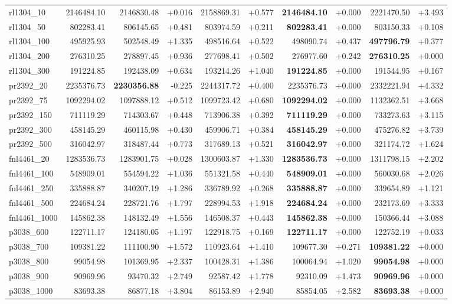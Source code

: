 \begin{table}[!htb]
\begin{tabular}{lrrrrrrrrr}
rl1304\_10 & 2146484.10 & 2146830.48 & +0.016 & 2158869.31 & +0.577 & \textbf{2146484.10} & +0.000 & 2221470.50 & +3.493 \\
rl1304\_50 & 802283.41 & 806145.65 & +0.481 & 803974.59 & +0.211 & \textbf{802283.41} & +0.000 & 803150.33 & +0.108 \\
rl1304\_100 & 495925.93 & 502548.49 & +1.335 & 498516.64 & +0.522 & 498090.74 & +0.437 & \textbf{497796.79} & +0.377 \\
rl1304\_200 & 276310.25 & 278897.45 & +0.936 & 277698.41 & +0.502 & 276977.60 & +0.242 & \textbf{276310.25} & +0.000 \\
rl1304\_300 & 191224.85 & 192438.09 & +0.634 & 193214.26 & +1.040 & \textbf{191224.85} & +0.000 & 191544.95 & +0.167 \\
pr2392\_20 & 2235376.73 & \textbf{2230356.88} & -0.225 & 2244317.72 & +0.400 & 2235376.73 & +0.000 & 2332221.94 & +4.332 \\
pr2392\_75 & 1092294.02 & 1097888.12 & +0.512 & 1099723.42 & +0.680 & \textbf{1092294.02} & +0.000 & 1132362.51 & +3.668 \\
pr2392\_150 & 711119.29 & 714303.67 & +0.448 & 713906.38 & +0.392 & \textbf{711119.29} & +0.000 & 733273.63 & +3.115 \\
pr2392\_300 & 458145.29 & 460115.98 & +0.430 & 459906.71 & +0.384 & \textbf{458145.29} & +0.000 & 475276.82 & +3.739 \\
pr2392\_500 & 316042.97 & 318487.44 & +0.773 & 317689.13 & +0.521 & \textbf{316042.97} & +0.000 & 321174.72 & +1.624 \\
fnl4461\_20 & 1283536.73 & 1283901.75 & +0.028 & 1300603.87 & +1.330 & \textbf{1283536.73} & +0.000 & 1311798.15 & +2.202 \\
fnl4461\_100 & 548909.01 & 554594.22 & +1.036 & 551321.58 & +0.440 & \textbf{548909.01} & +0.000 & 560030.68 & +2.026 \\
fnl4461\_250 & 335888.87 & 340207.19 & +1.286 & 336789.92 & +0.268 & \textbf{335888.87} & +0.000 & 339654.89 & +1.121 \\
fnl4461\_500 & 224684.24 & 228721.76 & +1.797 & 228994.53 & +1.918 & \textbf{224684.24} & +0.000 & 232173.69 & +3.333 \\
fnl4461\_1000 & 145862.38 & 148132.49 & +1.556 & 146508.37 & +0.443 & \textbf{145862.38} & +0.000 & 150366.44 & +3.088 \\
p3038\_600 & 122711.17 & 124180.05 & +1.197 & 122918.75 & +0.169 & \textbf{122711.17} & +0.000 & 122752.19 & +0.033 \\
p3038\_700 & 109381.22 & 111100.90 & +1.572 & 110923.64 & +1.410 & 109677.30 & +0.271 & \textbf{109381.22} & +0.000 \\
p3038\_800 & 99054.98 & 101369.95 & +2.337 & 100428.31 & +1.386 & 100064.94 & +1.020 & \textbf{99054.98} & +0.000 \\
p3038\_900 & 90969.96 & 93470.32 & +2.749 & 92587.42 & +1.778 & 92310.09 & +1.473 & \textbf{90969.96} & +0.000 \\
p3038\_1000 & 83693.38 & 86877.18 & +3.804 & 86153.89 & +2.940 & 85854.05 & +2.582 & \textbf{83693.38} & +0.000 \\
\hline
\end{tabular}
\end{table}
